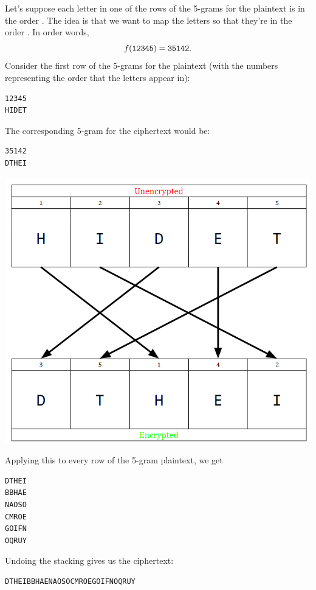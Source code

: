 \documentclass[letterpaper]{article}
\begin{document}
\begin{mdframed}[]
\begin{center}
    \end{center}
    Let's suppose each letter in one of the rows of the 5-grams for the plaintext is in the order \textbf{}. The idea is that we want to map the letters so that they're in the order \textbf{}. In order words, 
    \[f(\texttt{12345}) = \texttt{35142}.\]
    Consider the first row of the 5-grams for the plaintext (with the numbers representing the order that the letters appear in):
    \begin{mdframed}
        \begin{verbatim}
12345
HIDET\end{verbatim}
    \end{mdframed}
    The corresponding 5-gram for the ciphertext would be: 
    \begin{mdframed}
        \begin{verbatim}
35142
DTHEI\end{verbatim}
    \end{mdframed}
    \begin{center}
        \includegraphics[scale=0.7]{../assets/ex1_hidet.png}
    \end{center}
    Applying this to every row of the 5-gram plaintext, we get 
    \begin{mdframed}
        \begin{verbatim}
DTHEI
BBHAE
NAOSO
CMROE
GOIFN
OQRUY\end{verbatim}
    \end{mdframed}
    Undoing the stacking gives us the ciphertext: 
    \begin{mdframed}
        \begin{verbatim}
DTHEIBBHAENAOSOCMROEGOIFNOQRUY\end{verbatim}
    \end{mdframed}
\end{mdframed}
\end{document}
